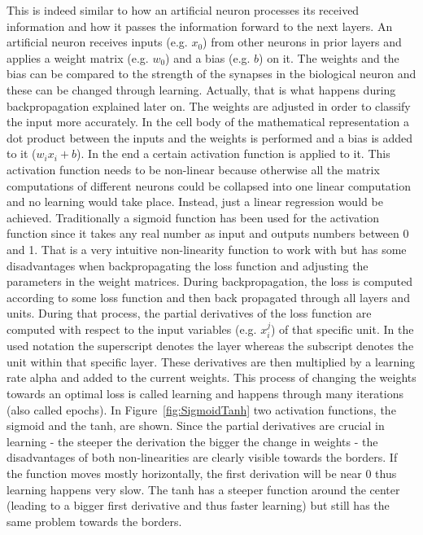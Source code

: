 This is indeed similar to how an artificial neuron processes its received information and how it passes the information forward to the next layers. An artificial neuron receives inputs (e.g. $x_0$) from other neurons in prior layers and applies a weight matrix (e.g. $w_0$) and a bias (e.g. $b$) on it. The weights and the bias can be compared to the strength of the synapses in the biological neuron and these can be changed through learning. Actually, that is what happens during backpropagation explained later on. The weights are adjusted in order to classify the input more accurately. In the cell body of the mathematical representation a dot product between the inputs and the weights is performed and a bias is added to it ($w_i x_i + b$). In the end a certain activation function is applied to it. This activation function needs to be non-linear because otherwise all the matrix computations of different neurons could be collapsed into one linear computation and no learning would take place. Instead, just a linear regression would be achieved.
Traditionally a sigmoid function has been used for the activation function since it takes any real number as input and outputs numbers between 0 and 1. That is a very intuitive non-linearity function to work with but has some disadvantages when backpropagating the loss function and adjusting the parameters in the weight matrices.  During backpropagation, the loss is computed according to some loss function and then back propagated through all layers and units. During that process, the partial derivatives of the loss function are computed with respect to the input variables (e.g. $x_i^j$) of that specific unit. In the used notation the superscript denotes the layer whereas the subscript denotes the unit within that specific layer. These derivatives are then multiplied by a learning rate alpha and added to the current weights. This process of changing the weights towards an optimal loss is called learning and happens through many iterations (also called epochs). In Figure~\ref{fig:SigmoidTanh} two activation functions, the sigmoid and the tanh, are shown. Since the partial derivatives are crucial in learning - the steeper the derivation the bigger the change in weights - the disadvantages of both non-linearities are clearly visible towards the borders. If the function moves mostly horizontally, the first derivation will be near 0 thus learning happens very slow. The tanh has a steeper function around the center (leading to a bigger first derivative and thus faster learning) but still has the same problem towards the borders.\\


